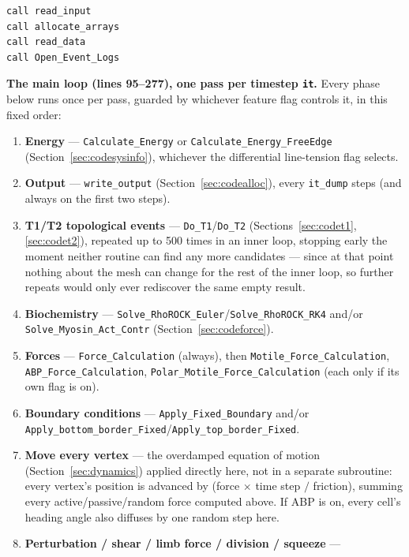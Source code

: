 \documentclass[11pt]{article}
\begin{document}
\begin{lstlisting}[caption={The four fixed setup calls at the very start of \texttt{vertexmain}.}]
call read_input
call allocate_arrays
call read_data
call Open_Event_Logs
\end{lstlisting}

\textbf{The main loop (lines 95--277), one pass per timestep \texttt{it}.} Every phase
below runs once per pass, guarded by whichever feature flag controls it, in this fixed
order:

\begin{enumerate}[nosep, leftmargin=1.7em]
  \item \textbf{Energy} --- \texttt{Calculate\_Energy} or \texttt{Calculate\_Energy\_FreeEdge}
  (Section~\ref{sec:codesysinfo}), whichever the differential line-tension flag selects.
  \item \textbf{Output} --- \texttt{write\_output} (Section~\ref{sec:codealloc}), every
  \texttt{it\_dump} steps (and always on the first two steps).
  \item \textbf{T1/T2 topological events} --- \texttt{Do\_T1}/\texttt{Do\_T2}
  (Sections~\ref{sec:codet1}, \ref{sec:codet2}), repeated up to 500 times in an inner
  loop, stopping early the moment neither routine can find any more candidates --- since
  at that point nothing about the mesh can change for the rest of the inner loop, so
  further repeats would only ever rediscover the same empty result.
  \item \textbf{Biochemistry} --- \texttt{Solve\_RhoROCK\_Euler}/\texttt{Solve\_RhoROCK\_RK4}
  and/or \texttt{Solve\_Myosin\_Act\_Contr} (Section~\ref{sec:codeforce}).
  \item \textbf{Forces} --- \texttt{Force\_Calculation} (always), then
  \texttt{Motile\_Force\_Calculation}, \texttt{ABP\_Force\_Calculation},
  \texttt{Polar\_Motile\_Force\_Calculation} (each only if its own flag is on).
  \item \textbf{Boundary conditions} --- \texttt{Apply\_Fixed\_Boundary} and/or
  \texttt{Apply\_bottom\_border\_Fixed}/\texttt{Apply\_top\_border\_Fixed}.
  \item \textbf{Move every vertex} --- the overdamped equation of motion
  (Section~\ref{sec:dynamics}) applied directly here, not in a separate subroutine: every
  vertex's position is advanced by (force $\times$ time step $/$ friction), summing
  every active/passive/random force computed above. If ABP is on, every cell's heading
  angle also diffuses by one random step here.
  \item \textbf{Perturbation / shear / limb force / division / squeeze} ---

\end{enumerate}
\end{document}

